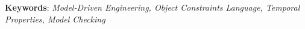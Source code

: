 \begin{small}
\textbf{Keywords}: \textit{Model-Driven Engineering, Object Constraints Language, Temporal Properties, Model Checking}

\end{small}
